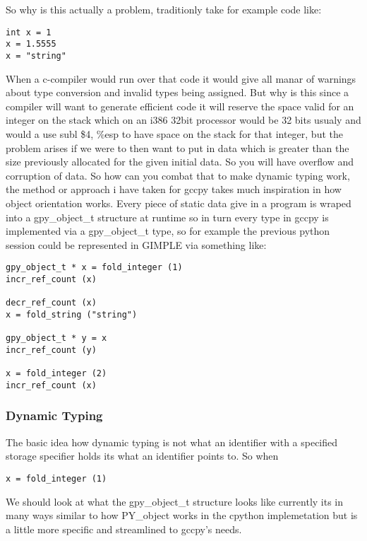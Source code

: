 \documentclass[defaultstyle,11pt]{article}
\begin{document}
So why is this actually a problem, traditionly take for example code like:

\begin{lstlisting}
int x = 1
x = 1.5555
x = "string"
\end{lstlisting}

When a c-compiler would run over that code it would give all manar of warnings about type conversion and invalid
types being assigned. But why is this since a compiler will want to generate efficient code it will reserve the space valid
for an integer on the stack which on an i386 32bit processor would be 32 bits usualy and would a use subl \$4, \%esp to have
space on the stack for that integer, but the problem arises if we were to then want to put in data which is greater than the
size previously allocated for the given initial data. So you will have overflow and corruption of data. So how can you
combat that to make dynamic typing work, the method or approach i have taken for gccpy takes much inspiration in how
object orientation works. Every piece of static data give in a program is wraped into a gpy\_object\_t structure at runtime so
in turn every type in gccpy is implemented via a gpy\_object\_t type, so for example the previous python session could be represented
in GIMPLE via something like:

\begin{lstlisting}
gpy_object_t * x = fold_integer (1)
incr_ref_count (x)

decr_ref_count (x)
x = fold_string ("string")

gpy_object_t * y = x
incr_ref_count (y)

x = fold_integer (2)
incr_ref_count (x)
\end{lstlisting}

\subsubsection{Dynamic Typing}

The basic idea how dynamic typing is not what an identifier with a specified storage specifier holds its what an identifier
points to. So when

\begin{lstlisting}
x = fold_integer (1)
\end{lstlisting}

We should look at what the gpy\_object\_t structure looks like currently its in many
ways similar to how PY\_object works in the cpython implemetation but is a little more specific and streamlined to gccpy's needs.
\end{document}
